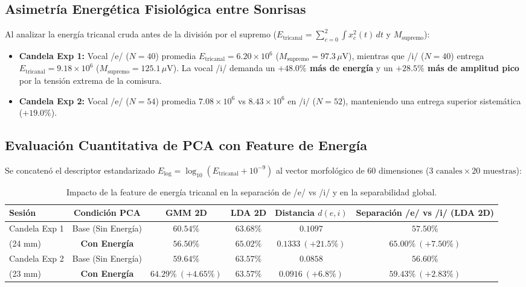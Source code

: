 \documentclass[11pt,a4paper]{article}
\begin{document}
\subsection{Asimetría Energética Fisiológica entre Sonrisas}
Al analizar la energía tricanal cruda antes de la división por el supremo ($E_{\text{tricanal}} = \sum_{c=0}^2 \int x_c^2(t)\,dt$ y $M_{\text{supremo}}$):
\begin{itemize}
    \item \textbf{Candela Exp 1:} Vocal /e/ ($N=40$) promedia $E_{\text{tricanal}} = 6.20 \times 10^6$ ($M_{\text{supremo}} = 97.3\,\mu\text{V}$), mientras que /i/ ($N=40$) entrega $E_{\text{tricanal}} = 9.18 \times 10^6$ ($M_{\text{supremo}} = 125.1\,\mu\text{V}$). La vocal /i/ demanda un \textbf{$+48.0\%$ más de energía} y un \textbf{$+28.5\%$ más de amplitud pico} por la tensión extrema de la comisura.
    \item \textbf{Candela Exp 2:} Vocal /e/ ($N=54$) promedia $7.08 \times 10^6$ vs $8.43 \times 10^6$ en /i/ ($N=52$), manteniendo una entrega superior sistemática ($+19.0\%$).
\end{itemize}

\subsection{Evaluación Cuantitativa de PCA con Feature de Energía}
Se concatenó el descriptor estandarizado $E_{\text{log}} = \log_{10}(E_{\text{tricanal}} + 10^{-9})$ al vector morfológico de 60 dimensiones ($3\text{ canales} \times 20\text{ muestras}$):

\begin{table}[H]
\centering
\footnotesize
\begin{tabularx}{\textwidth}{p{2.6cm} c c c c c}
\toprule
\textbf{Sesión} & \textbf{Condición PCA} & \textbf{GMM 2D} & \textbf{LDA 2D} & \textbf{Distancia $d(e,i)$} & \textbf{Separación /e/ vs /i/ (LDA 2D)} \\
\midrule
Candela Exp 1 & Base (Sin Energía)      & $60.54\%$ & $63.68\%$ & $0.1097$ & $57.50\%$ \\
(24 mm)       & \textbf{Con Energía}    & $56.50\%$ & $\mathbf{65.02\%}$ & $\mathbf{0.1333 \ (+21.5\%)}$ & $\mathbf{65.00\% \ (+7.50\%)}$ \\
\midrule
Candela Exp 2 & Base (Sin Energía)      & $59.64\%$ & $63.57\%$ & $0.0858$ & $56.60\%$ \\
(23 mm)       & \textbf{Con Energía}    & $\mathbf{64.29\% \ (+4.65\%)}$ & $\mathbf{63.57\%}$ & $\mathbf{0.0916 \ (+6.8\%)}$ & $\mathbf{59.43\% \ (+2.83\%)}$ \\
\bottomrule
\end{tabularx}
\caption{Impacto de la feature de energía tricanal en la separación de /e/ vs /i/ y en la separabilidad global.}
\label{tab:pca_energia}
\end{table}
\end{document}
